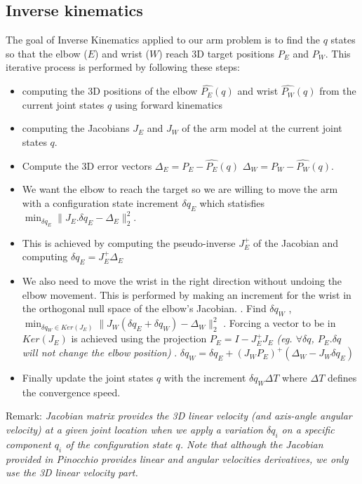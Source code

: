 \subsection{Inverse kinematics}
\label{app:inverse_kinematics}
The goal of Inverse Kinematics applied to our arm problem is to find the $q$ states so that the elbow ($E$) and wrist ($W$)
reach 3D target positions $P_{E}$ and $P_{W}$.
This iterative process is performed by following these steps:
\begin{itemize}
    \item computing the 3D positions of the elbow $\hat{P_{E}}(q)$ and wrist $\hat{P_{W}}(q)$ from the current joint states $q$ using forward kinematics
    \item computing the Jacobians $J_{E}$ and $J_{W}$ of the arm model at the current joint states $q$.
    \item Compute the 3D error vectors 
        \subitem $\Delta_{E} =P_{E} - \hat{P_{E}}(q)$ 
        \subitem $\Delta_{W} =P_{W} - \hat{P_{W}}(q)$. 
    \item We want the elbow to reach the target so we are willing to move the arm with a configuration state increment 
    $\delta q_{E}$ which statisfies $\min_{\delta q_{E}} \|J_{E}.\delta q_{E} - \Delta_{E}\|_2^2.$
    \item This is achieved by computing the pseudo-inverse $J_{E}^+$ of the Jacobian and computing $\delta q_{E} = J_{E}^+ \Delta_{E}$
    \item We also need to move the wrist in the right direction without undoing the elbow movement. This is performed by making an increment for the wrist in the orthogonal null space of the elbow's Jacobian.
    \subitem . Find $\delta q_{W}$ , $\min_{\delta q_{W}\in Ker(J_{E})} \|J_{W} (\delta q_{E} + \delta q_{W}) - \Delta_{W}\|_2^2$
    \subitem . Forcing a vector to be in $Ker(J_{E})$ is achieved using the projection $P_{E}=I-J_{E}^{+}J_{E}$
    \textit{(eg. $\forall \delta q$, $P_{E}.\delta q$ will not change the elbow position)}
    \subitem . $\delta q_{W} = \delta q_{E} + {(J_{W}P_{E})}^{+} (\Delta_{W} - J_{W} \delta q_{E})$
    \item Finally update the joint states $q$ with the increment $\delta q_{W} \Delta T$ where $\Delta T$ defines the convergence speed.
\end{itemize}

Remark: \textit{Jacobian matrix provides the 3D linear velocity 
(and axis-angle angular velocity) at a given joint location when we apply a variation $\delta q_i$ on a specific component $q_i$ of the configuration state $q$.
Note that although the Jacobian provided in Pinocchio provides linear and angular velocities derivatives, we only use the 3D linear velocity part.}

